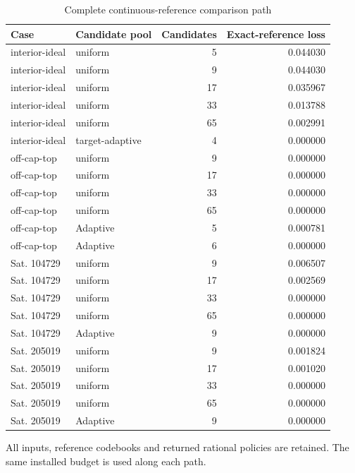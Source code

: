 \begin{table}[p]\centering\small
\caption{Complete continuous-reference comparison path}\label{tab:r45-cont-full}
\begin{tabular}{llrr}\toprule
Case & Candidate pool & Candidates & Exact-reference loss \\
\midrule
interior-ideal & uniform & 5 & 0.044030 \\
interior-ideal & uniform & 9 & 0.044030 \\
interior-ideal & uniform & 17 & 0.035967 \\
interior-ideal & uniform & 33 & 0.013788 \\
interior-ideal & uniform & 65 & 0.002991 \\
interior-ideal & target-adaptive & 4 & 0.000000 \\
off-cap-top & uniform & 9 & 0.000000 \\
off-cap-top & uniform & 17 & 0.000000 \\
off-cap-top & uniform & 33 & 0.000000 \\
off-cap-top & uniform & 65 & 0.000000 \\
off-cap-top & Adaptive & 5 & 0.000781 \\
off-cap-top & Adaptive & 6 & 0.000000 \\
Sat. 104729 & uniform & 9 & 0.006507 \\
Sat. 104729 & uniform & 17 & 0.002569 \\
Sat. 104729 & uniform & 33 & 0.000000 \\
Sat. 104729 & uniform & 65 & 0.000000 \\
Sat. 104729 & Adaptive & 9 & 0.000000 \\
Sat. 205019 & uniform & 9 & 0.001824 \\
Sat. 205019 & uniform & 17 & 0.001020 \\
Sat. 205019 & uniform & 33 & 0.000000 \\
Sat. 205019 & uniform & 65 & 0.000000 \\
Sat. 205019 & Adaptive & 9 & 0.000000 \\
\bottomrule\end{tabular}
\par\smallskip\begin{minipage}{.98\textwidth}\footnotesize All inputs, reference codebooks and returned rational policies are retained. The same installed budget is used along each path.\end{minipage}
\end{table}
